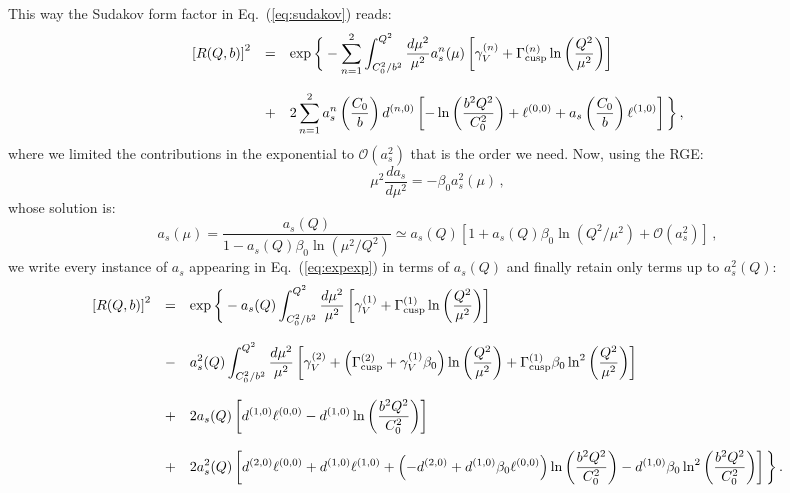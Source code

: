 \documentclass[10pt,a4paper]{article}
\begin{document}
This way the Sudakov form factor in Eq.~(\ref{eq:sudakov}) reads:
\begin{equation}\label{eq:expexp}
\begin{array}{rcl}
  \displaystyle \left[R(Q,b)\right]^2&=&\displaystyle \exp\bigg\{-\sum_{n=1}^2\int_{C_0^2/b^2}^{Q^2}\frac{d\mu^2}{\mu^2}a_s^n(\mu)\left[\gamma_V^{(n)}+\Gamma_{\rm
                                         cusp}^{(n)}\ln\left(\frac{Q^2}{\mu^2}\right)\right]\\
  \\
                                     &+&\displaystyle  2
                                         \sum_{n=1}^2a_s^{n}\left(\frac{C_0}{b}\right)d^{(n,0)}\left[-\ln\left(\frac{b^2Q^2}{C_0^2}\right)+\ell^{(0,0)}+a_s\left(\frac{C_0}{b}\right)\ell^{(1,0)}\right]\bigg\}\,,
\end{array}
\end{equation}
where we limited the contributions in the exponential to
$\mathcal{O}(a_s^2)$ that is the order we need. Now, using the RGE:
\begin{equation}
\mu^2\frac{da_s}{d\mu^2}=-\beta_0a_s^2(\mu)\,,
\end{equation}
whose solution is:
\begin{equation}
a_s(\mu) = \frac{a_s(Q)}{1-a_s(Q)\beta_0\ln(\mu^2/Q^2)}\simeq a_s(Q)\left[1+a_s(Q)\beta_0\ln(Q^2/\mu^2)+\mathcal{O}(a_s^2)\right]\,,
\end{equation}
we write every instance of $a_s$ appearing in Eq.~(\ref{eq:expexp}) in
terms of $a_s(Q)$ and finally retain only terms up to $a_s^2(Q)$:
\begin{equation}\label{eq:sudint}
\begin{array}{rcl}
  \displaystyle \left[R(Q,b)\right]^2&=&\displaystyle \exp\bigg\{-a_s(Q)\int_{C_0^2/b^2}^{Q^2}\frac{d\mu^2}{\mu^2}\left[\gamma_V^{(1)}+\Gamma_{\rm
                                         cusp}^{(1)}\ln\left(\frac{Q^2}{\mu^2}\right)\right]\\
  \\
  &-&\displaystyle a_s^2(Q) \int_{C_0^2/b^2}^{Q^2}\frac{d\mu^2}{\mu^2}\left[\gamma_V^{(2)}+\left(\Gamma_{\rm
                                         cusp}^{(2)}+\gamma_V^{(1)}\beta_0 \right)\ln\left(\frac{Q^2}{\mu^2}\right)+\Gamma_{\rm
                                         cusp}^{(1)}\beta_0\ln^2\left(\frac{Q^2}{\mu^2}\right)\right]\\
  \\
                                     &+&\displaystyle  2
                                         a_s(Q) \left[d^{(1,0)}\ell^{(0,0)}-d^{(1,0)}\ln\left(\frac{b^2Q^2}{C_0^2}\right)\right]\\
  \\ &+&\displaystyle  2 a_s^{2}(Q) \left[d^{(2,0)}\ell^{(0,0)} +
         d^{(1,0)}\ell^{(1,0)}+\left(-d^{(2,0)}+d^{(1,0)}\beta_0
         \ell^{(0,0)}\right)\ln\left(\frac{b^2Q^2}{C_0^2}\right)-d^{(1,0)}\beta_0
         \ln^2\left(\frac{b^2Q^2}{C_0^2}\right) \right]\bigg\}\,.
\end{array}
\end{equation}
\end{document}
